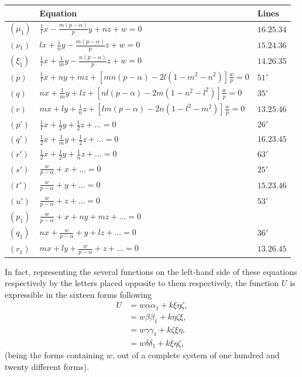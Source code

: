 \documentclass[11pt,a4paper]{article}
\theoremstyle{definition}
\begin{document}
\begin{table}[h]
\centering
\begin{tabular}{@{}lll@{}}
\toprule
& Equation & Lines \\
\midrule
$(\mu_{1})$ & $\frac{1}{l}x - \frac{m(p-\alpha)}{p}y + nz + w = 0$ & $16.25.34$ \\
$(\nu_{1})$ & $lx + \frac{1}{n}y - \frac{m(p-\alpha)}{p}z + w = 0$ & $15.24.36$ \\
$(\xi_{1})$ & $\frac{1}{l}x + \frac{1}{m}y - \frac{n(p-\alpha)}{p}z + w = 0$ & $14.26.35$ \\
$(p)$ & $\frac{1}{l}x + ny + mz + [mn(p-\alpha) - 2l(1-m^{2}-n^{2})]\frac{w}{p} = 0$ & $51'$ \\
$(q)$ & $nx + \frac{1}{m}y + lz + [nl(p-\alpha) - 2m(1-n^{2}-l^{2})]\frac{w}{p} = 0$ & $35'$ \\
$(r)$ & $mx + ly + \frac{1}{n}z + [lm(p-\alpha) - 2n(1-l^{2}-m^{2})]\frac{w}{p} = 0$ & $13.25.46$ \\
$(p')$ & $\frac{1}{l}x + \frac{1}{2}y + \frac{1}{2}z + \ldots = 0$ & $26'$ \\
$(q')$ & $\frac{1}{2}x + \frac{1}{m}y + \frac{1}{2}z + \ldots = 0$ & $16.23.45$ \\
$(r')$ & $\frac{1}{2}x + \frac{1}{2}y + \frac{1}{n}z + \ldots = 0$ & $63'$ \\
$(s')$ & $\frac{w}{p-\alpha} + x + \ldots = 0$ & $25'$ \\
$(t')$ & $\frac{w}{p-\alpha} + y + \ldots = 0$ & $15.23.46$ \\
$(u')$ & $\frac{w}{p-\alpha} + z + \ldots = 0$ & $53'$ \\
$(p_{1})$ & $\frac{w}{p-\alpha} + x + ny + mz + \ldots = 0$ & \\
$(q_{1})$ & $nx + \frac{w}{p-\alpha} + y + lz + \ldots = 0$ & $36'$ \\
$(r_{1})$ & $mx + ly + \frac{w}{p-\alpha} + z + \ldots = 0$ & $13.26.45$ \\
\bottomrule
\end{tabular}
\end{table}

In fact, representing the several functions on the left-hand side of these equations respectively by the letters placed opposite to them respectively, the function $U$ is expressible in the sixteen forms following
\begin{align*}
U &= w\alpha\alpha_{1} + k\xi\eta\zeta, \\
&= w\beta\beta_{1} + k\eta\zeta\xi, \\
&= w\gamma\gamma_{1} + k\zeta\xi\eta, \\
&= w\delta\delta_{1} + k\xi\eta\zeta,
\end{align*}
(being the forms containing $w$, out of a complete system of one hundred and twenty different forms).
\end{document}
